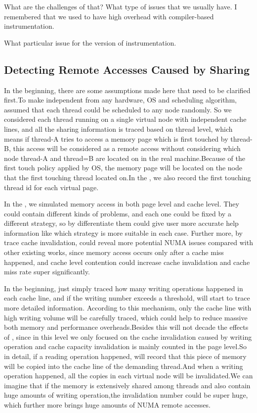 What are the challenges of that? 
What type of issues that we usually have. I remembered that we used to have high overhead with compiler-based instrumentation.

What particular issue for the version of instrumentation. 

\subsection{Detecting Remote Accesses Caused by Sharing}
In the beginning, there are some assumptions \NP{} made here that need to be clarified first.To make \NP{} independent from any hardware, OS and scheduling algorithm, \NP{} assumed that each thread could be scheduled to any node randomly. So we considered each thread running on a single virtual node with independent cache lines, and all the sharing information is traced based on thread level, which means if thread-A tries to access a memory page which is first touched by thread-B, this access will be considered as a remote access without considering which node thread-A and thread=B are located on in the real machine.Because of the first touch policy applied by OS, the memory page will be located on the node that the first touching thread located on.In the \NP{}, we also record the first touching thread id for each virtual page.

In the \NP{}, we simulated memory access in both page level and cache level. They could contain different kinds of problems, and each one could be fixed by a different strategy, so by differentiate them \NP{} could give user more accurate help information like which strategy is more suitable in each case. Further more, by trace cache invalidation, \NP{} could reveal more potential NUMA issues compared with other existing works, since memory access occurs only after a cache miss happened, and cache level contention could increase cache invalidation and cache miss rate super significantly.

In the beginning, \NP{} just simply traced how many writing operations happened in each cache line, and if the writing number exceeds a threshold, \NP{} will start to trace more detailed information. According to this mechanism, only the cache line with high writing volume will be carefully traced, which could help to reduce massive both memory and performance overheads.Besides this will not decade the effects of \NP{}, since in this level we only focused on the cache invalidation caused by writing operation and cache capacity invalidation is mainly counted in the page level.So in detail, if a reading operation happened, \NP{} will record that this piece of memory will be copied into the cache line of the demanding thread.And when a writing operation happened, all the copies in each virtual node will be invalidated.We can imagine that if the memory is extensively shared among threads and also contain huge amounts of writing operation,the invalidation number could be super huge, which further more brings huge amounts of NUMA remote accesses. 

